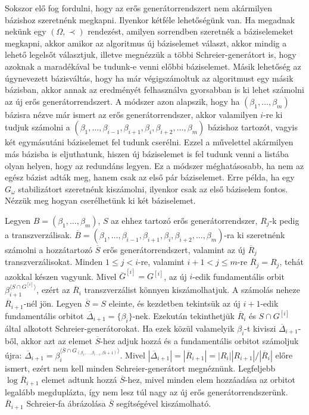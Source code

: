 Sokszor elő fog fordulni, hogy az erős generátorrendszert nem akármilyen bázishoz szeretnénk megkapni.
Ilyenkor kétféle lehetőségünk van.
Ha megadnak nekünk egy $(\Omega, \prec)$ rendezést, amilyen sorrendben szeretnék a báziselemeket megkapni, akkor amikor az algoritmus új báziselemet választ, akkor mindig a lehető legelsőt választjuk,
illetve megnézzük a többi Schreier-generátort is, hogy azoknak a maradékával be tudunk-e venni előbbi báziselemet.
Másik lehetőség az úgynevezett bázisváltás, hogy ha már végigszámoltuk az algoritmust egy másik bázisban, akkor annak az eredményét felhasználva gyorsabban is ki lehet számolni az új erős generátorrendszert.
A módszer azon alapszik, hogy ha $(\beta_1, \dots, \beta_m)$ bázisra nézve már ismert az erős generátorrendszer, akkor valamilyen $i$-re ki tudjuk számolni a $(\beta_1, \dots, \beta_{i-1}, \beta_{i+1}, \beta_i, \beta_{i+2}, \dots, \beta_m)$
bázishoz tartozót, vagyis két egymásutáni báziselemet fel tudunk cserélni.
Ezzel a művelettel akármilyen más bázisba is eljuthatunk, hiszen új báziselemet is fel tudunk venni a listába olyan helyen, hogy az redundáns legyen.
Ez a módszer méghatásosabb, ha nem az egész bázist adták meg, hanem csak az első pár báziselemet.
Erre példa, ha egy $G_{\omega}$ stabilizátort szeretnénk kiszámolni, ilyenkor csak az első báziselem fontos.
Nézzük meg hogyan cserélhetünk ki két báziselemet.

Legyen $B = (\beta_1, \dots, \beta_m)$, $S$ az ehhez tartozó erős generátorrendszer, $R_j$-k pedig a transzverzálisak.
$\overline{B} = (\beta_1, \dots, \beta_{i-1}, \beta_{i+1}, \beta_i, \beta_{i+2}, \dots, \beta_m)$-ra ki szeretnénk számolni a hozzátartozó $\overline{S}$ erős generátorrendszert, valamint az új $\overline{R}_j$ transzverzálisokat.
Minden $1 \le j < i$-re, valamint $i+1 < j \le m$-re $\overline{R}_j = R_j$, tehát azokkal készen vagyunk.
Mivel $\overline{G}^{[i]} = G^{[i]}$, az új $i$-edik fundamentális orbit $\beta_{i+1}^{\langle S \cap G^{[i]} \rangle}$, ezért az $\overline{R}_i$ transzverzálist könnyen kiszámolhatjuk.
A számolás neheze $\overline{R}_{i+1}$-nél jön.
Legyen $\overline{S} = S$ eleinte, és kezdetben tekintsük az új $i+1$-edik fundamentális orbitot $\overline{\Delta}_{i+1} = \{\beta_i\}$-nek.
Ezekután tekinthetjük $\overline{R}_i$ és $S\cap G^{[i]}$ által alkotott Schreier-generátorokat.
Ha ezek közül valamelyik $\beta_i$-t kiviszi $\overline{\Delta}_{i+1}$-ből, akkor azt az elemet $\overline{S}$-hez adjuk hozzá és a fundamentális orbitot számoljuk újra:
$\overline{\Delta}_{i+1} = \beta_i^{\langle \overline{S} \cap G_{(\beta_1,\dots,\beta_{i-1},\beta{i+1})} \rangle}$.
Mivel $|\overline{\Delta}_{i+1}| = |\overline{R}_{i+1}| = |R_i| |R_{i+1}| / |\overline{R}_i|$ előre ismert, ezért nem kell minden Schreier-generátort megnéznünk.
Legfeljebb $\log \overline{R}_{i+1}$ elemet adtunk hozzá $\overline{S}$-hez, mivel minden elem hozzáadása az orbitot legalább megduplázta, így nem lesz túl nagy az új erős generátorrendszerünk.
$\overline{R}_{i+1}$ Schreier-fa ábrázolása $\overline{S}$ segítségével kiszámolható.

